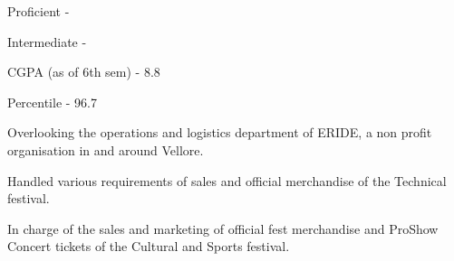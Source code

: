 








Proficient - 


Intermediate - 

\divider\smallskip



\medskip


CGPA (as of 6th sem) - 8.8

\divider\smallskip

Percentile - 96.7

\medskip

Overlooking the operations and logistics department of ERIDE, a non profit organisation in and around Vellore.

\divider\smallskip

Handled various requirements of sales and official merchandise of the Technical festival.


\divider\smallskip

In charge of the sales and marketing of official fest merchandise and ProShow Concert tickets of the Cultural and Sports festival.